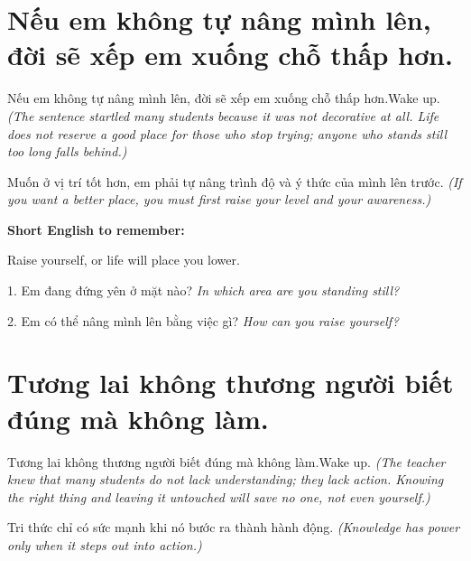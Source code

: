 \section{Nếu em không tự nâng mình lên, đời sẽ xếp em xuống chỗ thấp hơn.}
\begin{truyen}{Nếu em không tự nâng mình lên, đời sẽ xếp em xuống chỗ thấp hơn.}{Wake up.}
\textit{(The sentence startled many students because it was not decorative at all. Life does not reserve a good place for those who stop trying; anyone who stands still too long falls behind.)}
\end{truyen}

\begin{baihoc}
Muốn ở vị trí tốt hơn, em phải tự nâng trình độ và ý thức của mình lên trước.
\textit{(If you want a better place, you must first raise your level and your awareness.)}
\end{baihoc}

\begin{ghinhoanh}
\textbf{Short English to remember:}

Raise yourself, or life will place you lower.

\end{ghinhoanh}

\begin{tuhocnhanh}
1. Em đang đứng yên ở mặt nào? \textit{In which area are you standing still?}

2. Em có thể nâng mình lên bằng việc gì? \textit{How can you raise yourself?}
\end{tuhocnhanh}
\ngancach

\section{Tương lai không thương người biết đúng mà không làm.}
\begin{truyen}{Tương lai không thương người biết đúng mà không làm.}{Wake up.}
\textit{(The teacher knew that many students do not lack understanding; they lack action. Knowing the right thing and leaving it untouched will save no one, not even yourself.)}
\end{truyen}

\begin{baihoc}
Tri thức chỉ có sức mạnh khi nó bước ra thành hành động.
\textit{(Knowledge has power only when it steps out into action.)}
\end{baihoc}

